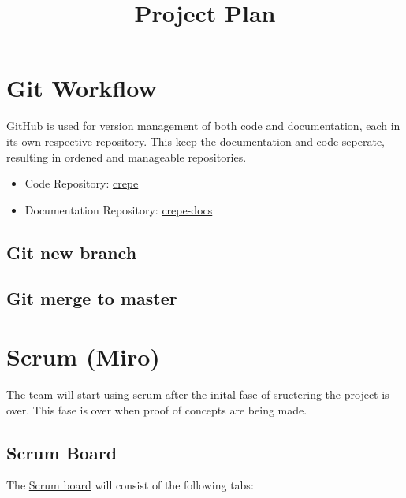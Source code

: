 \documentclass{projdoc}
\title{Project Plan}
\begin{document}
\section{Git Workflow}

GitHub is used for version management of both code and documentation, each in its own respective repository.
This keep the documentation and code seperate, resulting in ordened and manageable repositories. 

\begin{itemize}
    \item Code Repository: \href{https://github.com/lonkaars/crepe}{crepe}
    \item Documentation Repository: \href{https://github.com/lonkaars/crepe-docs}{crepe-docs}
\end{itemize}

\subsection{Git new branch}
\subsection{Git merge to master}
\newpage

\section{Scrum (Miro)}

The team will start using scrum after the inital fase of sructering the project is over.
This fase is over when proof of concepts are being made.

\subsection{Scrum Board}
The \href{https://miro.com/app/board/uXjVKjtdM64=/?share_link_id=303851465474}{Scrum board} will consist of the following tabs:
 
\end{document}
